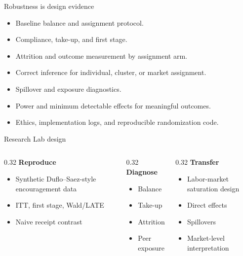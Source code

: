 \documentclass[aspectratio=169,11pt]{beamer}
\begin{document}
\begin{frame}{Robustness is design evidence}
\begin{itemize}
    \item Baseline balance and assignment protocol.
    \item Compliance, take-up, and first stage.
    \item Attrition and outcome measurement by assignment arm.
    \item Correct inference for individual, cluster, or market assignment.
    \item Spillover and exposure diagnostics.
    \item Power and minimum detectable effects for meaningful outcomes.
    \item Ethics, implementation logs, and reproducible randomization code.
\end{itemize}
\end{frame}

\begin{frame}{Research Lab design}
\begin{columns}[T,onlytextwidth]
\begin{column}{0.32\linewidth}
\textbf{Reproduce}
\begin{itemize}
    \item Synthetic Duflo--Saez-style encouragement data
    \item ITT, first stage, Wald/LATE
    \item Naive receipt contrast
\end{itemize}
\end{column}
\begin{column}{0.32\linewidth}
\textbf{Diagnose}
\begin{itemize}
    \item Balance
    \item Take-up
    \item Attrition
    \item Peer exposure
\end{itemize}
\end{column}
\begin{column}{0.32\linewidth}
\textbf{Transfer}
\begin{itemize}
    \item Labor-market saturation design
    \item Direct effects
    \item Spillovers
    \item Market-level interpretation
\end{itemize}
\end{column}
\end{columns}
\end{frame}
\end{document}
